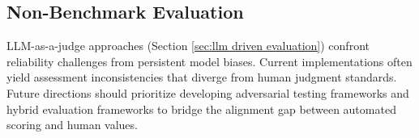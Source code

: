\subsection{Non-Benchmark Evaluation}
LLM-as-a-judge approaches (Section \ref{sec:llm driven evaluation}) confront reliability challenges from persistent model biases. Current implementations often yield assessment inconsistencies that diverge from human judgment standards. Future directions should prioritize developing adversarial testing frameworks and hybrid evaluation frameworks to bridge the alignment gap between automated scoring and human values.

